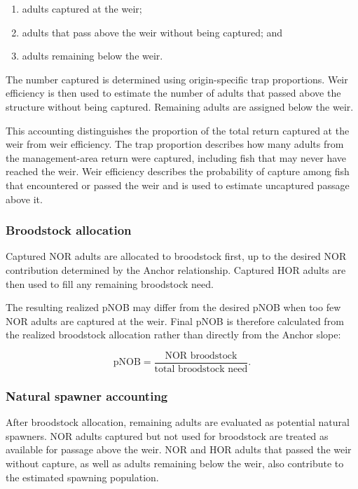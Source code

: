 \documentclass[12pt,letterpaper]{article}
\providecommand{\tightlist}{%
  \setlength{\itemsep}{0pt}\setlength{\parskip}{0pt}}
\begin{document}
\begin{enumerate}
\def\labelenumi{\arabic{enumi}.}
\tightlist
\item
  adults captured at the weir;
\item
  adults that pass above the weir without being captured; and
\item
  adults remaining below the weir.
\end{enumerate}

The number captured is determined using origin-specific trap proportions. Weir efficiency is then used to estimate the number of adults that passed above the structure without being captured. Remaining adults are assigned below the weir.

This accounting distinguishes the proportion of the total return captured at the weir from weir efficiency. The trap proportion describes how many adults from the management-area return were captured, including fish that may never have reached the weir. Weir efficiency describes the probability of capture among fish that encountered or passed the weir and is used to estimate uncaptured passage above it.

\subsubsection{Broodstock allocation}\label{broodstock-allocation}

Captured NOR adults are allocated to broodstock first, up to the desired NOR contribution determined by the Anchor relationship. Captured HOR adults are then used to fill any remaining broodstock need.

The resulting realized pNOB may differ from the desired pNOB when too few NOR adults are captured at the weir. Final pNOB is therefore calculated from the realized broodstock allocation rather than directly from the Anchor slope:

\[
\text{pNOB} =
\frac{\text{NOR broodstock}}{\text{total broodstock need}}.
\]

\subsubsection{Natural spawner accounting}\label{natural-spawner-accounting}

After broodstock allocation, remaining adults are evaluated as potential natural spawners. NOR adults captured but not used for broodstock are treated as available for passage above the weir. NOR and HOR adults that passed the weir without capture, as well as adults remaining below the weir, also contribute to the estimated spawning population.
\end{document}
